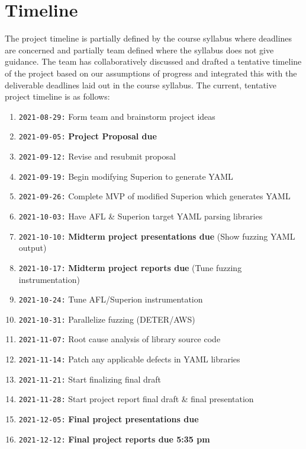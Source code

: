 \documentclass[12pt]{diazessay}
\begin{document}
\section*{Timeline}

The project timeline is partially defined by the course syllabus where deadlines are concerned and partially team defined where the syllabus does not give guidance.
The team has collaboratively discussed and drafted a tentative timeline of the project based on our assumptions of progress and integrated this with the deliverable deadlines laid out in the course syllabus. The current, tentative project timeline is as follows:

\begin{enumerate}[label={}]
	\item \texttt{2021-08-29:} Form team and brainstorm project ideas
	\item \texttt{2021-09-05:} \textbf{Project Proposal due}
	\item \texttt{2021-09-12:} Revise and resubmit proposal
	\item \texttt{2021-09-19:} Begin modifying Superion to generate YAML
	\item \texttt{2021-09-26:} Complete MVP of modified Superion which generates YAML
	\item \texttt{2021-10-03:} Have AFL \& Superion target YAML parsing libraries
	\item \texttt{2021-10-10:} \textbf{Midterm project presentations due} \hfill (Show fuzzing YAML output)
	\item \texttt{2021-10-17:} \textbf{Midterm project reports due} \hfill (Tune fuzzing instrumentation)
	\item \texttt{2021-10-24:} Tune AFL/Superion instrumentation 
	\item \texttt{2021-10-31:} Parallelize fuzzing \hfill (DETER/AWS)
	\item \texttt{2021-11-07:} Root cause analysis of library source code
	\item \texttt{2021-11-14:} Patch any applicable defects in YAML libraries
	\item \texttt{2021-11-21:} Start finalizing final draft
	\item \texttt{2021-11-28:} Start project report final draft \& final presentation
	\item \texttt{2021-12-05:} \textbf{Final project presentations due}
	\item \texttt{2021-12-12:} \textbf{Final project reports due 5:35 pm}
\end{enumerate}


\clearpage


\end{document}
